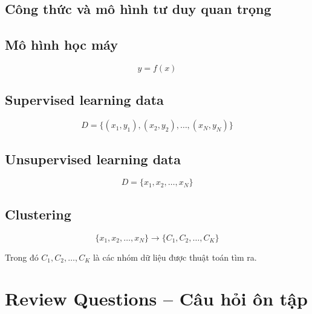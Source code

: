 \subsection{Công thức và mô hình tư duy quan trọng}

\subsection*{Mô hình học máy}

\[
    y=f(x)
\]

\subsection*{Supervised learning data}

\[
    D =
    \{(x_1,y_1),(x_2,y_2),\ldots,(x_N,y_N)\}
\]

\subsection*{Unsupervised learning data}

\[
    D =
    \{x_1,x_2,\ldots,x_N\}
\]

\subsection*{Clustering}

\[
    \{x_1,x_2,\ldots,x_N\}
    \rightarrow
    \{C_1,C_2,\ldots,C_K\}
\]

Trong đó $C_1,C_2,\ldots,C_K$ là các nhóm dữ liệu được thuật toán tìm ra.

\section{Review Questions -- Câu hỏi ôn tập}

